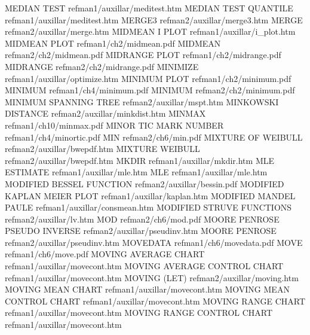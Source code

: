 MEDIAN TEST                             refman1/auxillar/meditest.htm
MEDIAN TEST QUANTILE                    refman1/auxillar/meditest.htm
MERGE3                                  refman2/auxillar/merge3.htm
MERGE                                   refman2/auxillar/merge.htm
MIDMEAN I PLOT                          refman1/auxillar/i_plot.htm
MIDMEAN PLOT                            refman1/ch2/midmean.pdf
MIDMEAN                                 refman2/ch2/midmean.pdf
MIDRANGE PLOT                           refman1/ch2/midrange.pdf
MIDRANGE                                refman2/ch2/midrange.pdf
MINIMIZE                                refman1/auxillar/optimize.htm
MINIMUM PLOT                            refman1/ch2/minimum.pdf
MINIMUM                                 refman1/ch4/minimum.pdf
MINIMUM                                 refman2/ch2/minimum.pdf
MINIMUM SPANNING TREE                   refman2/auxillar/mspt.htm
MINKOWSKI DISTANCE                      refman2/auxillar/minkdist.htm
MINMAX                                  refman1/ch10/minmax.pdf
MINOR TIC MARK NUMBER                   refman1/ch4/minortic.pdf
MIN                                     refman2/ch6/min.pdf
MIXTURE OF WEIBULL                      refman2/auxillar/bwepdf.htm
MIXTURE WEIBULL                         refman2/auxillar/bwepdf.htm
MKDIR                                   refman1/auxillar/mkdir.htm
MLE ESTIMATE                            refman1/auxillar/mle.htm
MLE                                     refman1/auxillar/mle.htm
MODIFIED BESSEL FUNCTION                refman2/auxillar/bessin.pdf
MODIFIED KAPLAN MEIER PLOT              refman1/auxillar/kaplan.htm
MODIFIED MANDEL PAULE                   refman1/auxillar/consmean.htm
MODIFIED STRUVE FUNCTIONS               refman2/auxillar/lv.htm
MOD                                     refman2/ch6/mod.pdf
MOORE PENROSE PSEUDO INVERSE            refman2/auxillar/pseudinv.htm
MOORE PENROSE                           refman2/auxillar/pseudinv.htm
MOVEDATA                                refman1/ch6/movedata.pdf
MOVE                                    refman1/ch6/move.pdf
MOVING AVERAGE CHART                    refman1/auxillar/movecont.htm
MOVING AVERAGE CONTROL CHART            refman1/auxillar/movecont.htm
MOVING (LET)                            refman2/auxillar/moving.htm
MOVING MEAN CHART                       refman1/auxillar/movecont.htm
MOVING MEAN CONTROL CHART               refman1/auxillar/movecont.htm
MOVING RANGE CHART                      refman1/auxillar/movecont.htm
MOVING RANGE CONTROL CHART              refman1/auxillar/movecont.htm
